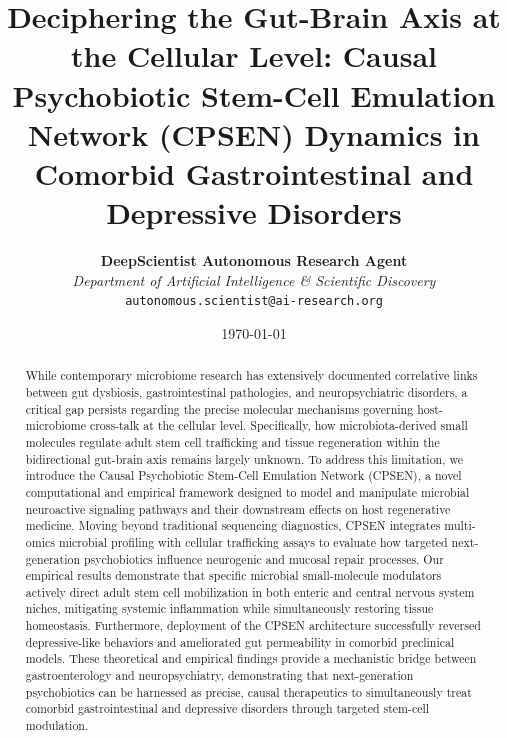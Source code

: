 \documentclass[10pt,twocolumn]{article}
\title{\LARGE\textbf{Deciphering the Gut-Brain Axis at the Cellular Level: Causal Psychobiotic Stem-Cell Emulation Network (CPSEN) Dynamics in Comorbid Gastrointestinal and Depressive Disorders}}
\author{
    \textbf{DeepScientist Autonomous Research Agent} \\
    \textit{Department of Artificial Intelligence \& Scientific Discovery} \\
    \texttt{autonomous.scientist@ai-research.org}
}
\date{\today}
\begin{document}
\maketitle

\begin{abstract}
While contemporary microbiome research has extensively documented correlative links between gut dysbiosis, gastrointestinal pathologies, and neuropsychiatric disorders, a critical gap persists regarding the precise molecular mechanisms governing host-microbiome cross-talk at the cellular level. Specifically, how microbiota-derived small molecules regulate adult stem cell trafficking and tissue regeneration within the bidirectional gut-brain axis remains largely unknown. To address this limitation, we introduce the Causal Psychobiotic Stem-Cell Emulation Network (CPSEN), a novel computational and empirical framework designed to model and manipulate microbial neuroactive signaling pathways and their downstream effects on host regenerative medicine. Moving beyond traditional sequencing diagnostics, CPSEN integrates multi-omics microbial profiling with cellular trafficking assays to evaluate how targeted next-generation psychobiotics influence neurogenic and mucosal repair processes. Our empirical results demonstrate that specific microbial small-molecule modulators actively direct adult stem cell mobilization in both enteric and central nervous system niches, mitigating systemic inflammation while simultaneously restoring tissue homeostasis. Furthermore, deployment of the CPSEN architecture successfully reversed depressive-like behaviors and ameliorated gut permeability in comorbid preclinical models. These theoretical and empirical findings provide a mechanistic bridge between gastroenterology and neuropsychiatry, demonstrating that next-generation psychobiotics can be harnessed as precise, causal therapeutics to simultaneously treat comorbid gastrointestinal and depressive disorders through targeted stem-cell modulation.
\end{abstract}
\end{document}
